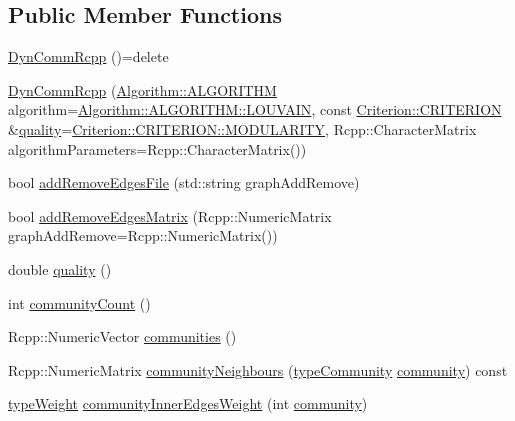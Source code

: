\subsection*{Public Member Functions}
\begin{DoxyCompactItemize}
\item 
\hyperlink{classDynCommRcpp_a65289b1838009023b527237b64c073a2}{Dyn\+Comm\+Rcpp} ()=delete
\item 
\hyperlink{classDynCommRcpp_a1e3ae3a0be89f2a661dc09d7842a3ac7}{Dyn\+Comm\+Rcpp} (\hyperlink{classAlgorithm_a38e19a8c3dc51b97563a34d9e59a748d}{Algorithm\+::\+A\+L\+G\+O\+R\+I\+T\+HM} algorithm=\hyperlink{classAlgorithm_a38e19a8c3dc51b97563a34d9e59a748dab77e66715d6be972cdbf6cc4d990e732}{Algorithm\+::\+A\+L\+G\+O\+R\+I\+T\+H\+M\+::\+L\+O\+U\+V\+A\+IN}, const \hyperlink{classCriterion_a55594c223ce0837b8319c46c66cb648f}{Criterion\+::\+C\+R\+I\+T\+E\+R\+I\+ON} \&\hyperlink{classDynCommRcpp_a3d9d6845d9e67941da187bca511cdfcf}{quality}=\hyperlink{classCriterion_a55594c223ce0837b8319c46c66cb648fa2a7d416fbe43baf234420601ea73d946}{Criterion\+::\+C\+R\+I\+T\+E\+R\+I\+O\+N\+::\+M\+O\+D\+U\+L\+A\+R\+I\+TY}, Rcpp\+::\+Character\+Matrix algorithm\+Parameters=Rcpp\+::\+Character\+Matrix())
\item 
bool \hyperlink{classDynCommRcpp_a9080af5a73f77db6eff4d7a41596902a}{add\+Remove\+Edges\+File} (std\+::string graph\+Add\+Remove)
\item 
bool \hyperlink{classDynCommRcpp_ae9fb6b69740abb2d52721ec76d744811}{add\+Remove\+Edges\+Matrix} (Rcpp\+::\+Numeric\+Matrix graph\+Add\+Remove=Rcpp\+::\+Numeric\+Matrix())
\item 
double \hyperlink{classDynCommRcpp_a3d9d6845d9e67941da187bca511cdfcf}{quality} ()
\item 
int \hyperlink{classDynCommRcpp_a67948d5821c2ccffc4dbf47bac6fba70}{community\+Count} ()
\item 
Rcpp\+::\+Numeric\+Vector \hyperlink{classDynCommRcpp_ade6d5c2ebbb13f2efb3988d0d0ac2c1e}{communities} ()
\item 
Rcpp\+::\+Numeric\+Matrix \hyperlink{classDynCommRcpp_ad23168e5fa7cf85d5508c646f3e39b9b}{community\+Neighbours} (\hyperlink{graphUndirectedGroupable_8h_a914da95c9ea7f14f4b7f875c36818556}{type\+Community} \hyperlink{classDynCommRcpp_ac3c8c1759d2ab106b757557e09834ec5}{community}) const
\item 
\hyperlink{edge_8h_a2e7ea3be891ac8b52f749ec73fee6dd2}{type\+Weight} \hyperlink{classDynCommRcpp_aed6b4f1e844956429eb9a15d8d6df7b6}{community\+Inner\+Edges\+Weight} (int \hyperlink{classDynCommRcpp_ac3c8c1759d2ab106b757557e09834ec5}{community})

\end{DoxyCompactItemize}
